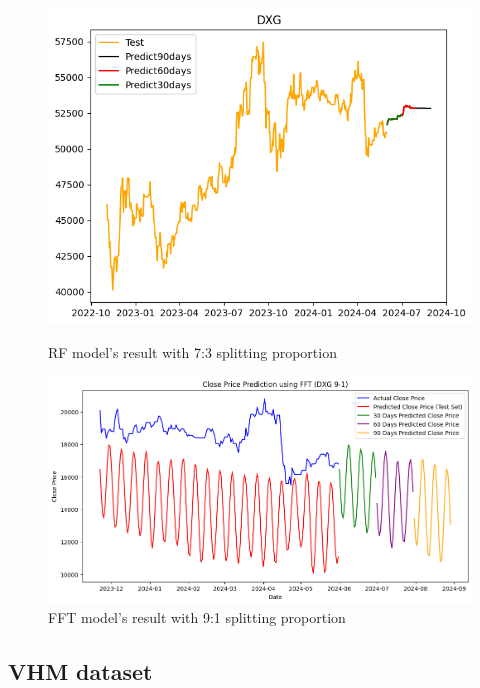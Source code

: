 \documentclass{ieeeojies}
\begin{document}
\begin{figure}[H]
  \centering
  \begin{minipage}{0.23\textwidth}
  \centering
  \includegraphics[width=1\textwidth]{bibliography/Figure/RF_7-3.png}
  \caption{RF model's result with 7:3 splitting proportion}
  \label{fig:1}
  \end{minipage}
  \hfill
  \begin{minipage}{0.23\textwidth}
  \centering
  \includegraphics[width=1\textwidth]{bibliography/Figure/FFT_DXG(9-1).png}
  \caption{FFT model's result with 9:1 splitting proportion}
  \label{fig:2}
  \end{minipage}
\end{figure}


\subsection{VHM dataset} 
\end{document}
